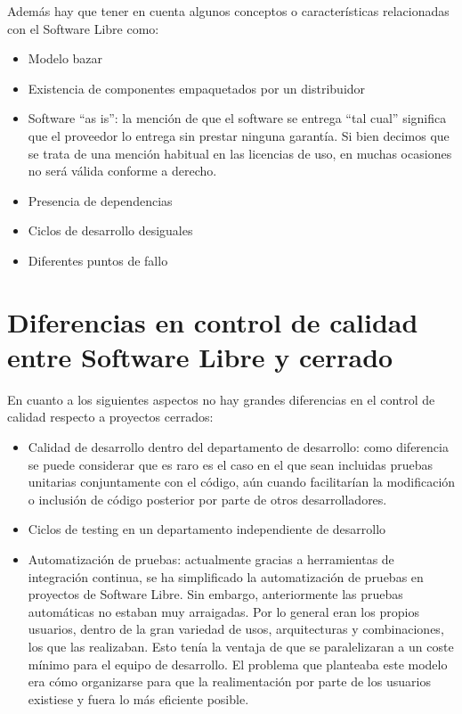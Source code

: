 Además hay que tener en cuenta algunos conceptos o características relacionadas con el Software Libre como:
\begin{itemize}
     \item Modelo bazar
     \item Existencia de componentes empaquetados por un distribuidor
     \item Software “as is”: la mención de que el software se entrega “tal cual” significa que el proveedor lo entrega sin prestar ninguna garantía. Si bien decimos que se trata de una mención habitual en las licencias de uso, en muchas ocasiones no será válida conforme a derecho.
     \item Presencia de dependencias
     \item Ciclos de desarrollo desiguales
     \item Diferentes puntos de fallo
\end{itemize}

\section{Diferencias en control de calidad entre Software Libre y cerrado}

En cuanto a los siguientes aspectos no hay grandes diferencias en el control de calidad respecto a proyectos cerrados:

\begin{itemize}
     \item Calidad de desarrollo dentro del departamento de desarrollo: como diferencia se puede considerar que es raro es el caso en el que sean incluidas pruebas unitarias conjuntamente con el código, aún cuando facilitarían la modificación o inclusión de código posterior por parte de otros desarrolladores.
     \item Ciclos de testing en un departamento independiente de desarrollo
     \item Automatización de pruebas: actualmente gracias a herramientas de integración continua, se ha simplificado la automatización de pruebas en proyectos de Software Libre. Sin embargo, anteriormente las pruebas automáticas no estaban muy arraigadas. Por lo general eran los propios usuarios, dentro de la gran variedad de usos, arquitecturas y combinaciones, los que las realizaban. Esto tenía la ventaja de que se paralelizaran a un coste mínimo para el equipo de desarrollo. El problema que planteaba este modelo era cómo organizarse para que la realimentación por parte de los usuarios existiese y fuera lo más eficiente posible. 
\end{itemize}

